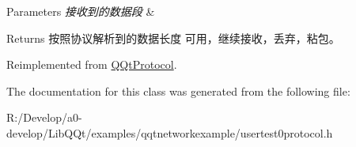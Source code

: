 \begin{DoxyParams}{Parameters}
{\em 接收到的数据段} & \\
\hline
\end{DoxyParams}
\begin{DoxyReturn}{Returns}
按照协议解析到的数据长度 可用，继续接收，丢弃，粘包。 
\end{DoxyReturn}


Reimplemented from \mbox{\hyperlink{class_q_qt_protocol_a00fd0c1ac23379ed3b9b25da9a34f39b}{Q\+Qt\+Protocol}}.



The documentation for this class was generated from the following file\+:\begin{DoxyCompactItemize}
\item 
R\+:/\+Develop/a0-\/develop/\+Lib\+Q\+Qt/examples/qqtnetworkexample/usertest0protocol.\+h\end{DoxyCompactItemize}
